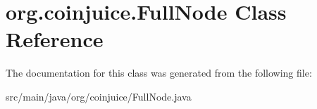 \hypertarget{classorg_1_1coinjuice_1_1_full_node}{\section{org.\-coinjuice.\-Full\-Node Class Reference}
\label{classorg_1_1coinjuice_1_1_full_node}
}


The documentation for this class was generated from the following file\-:\begin{DoxyCompactItemize}
\item 
src/main/java/org/coinjuice/Full\-Node.\-java\end{DoxyCompactItemize}

